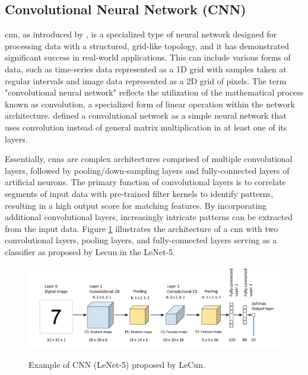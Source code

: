 \subsection{Convolutional Neural Network (CNN)}
\label{subsec:convolutional_neural_network_CNN}

\gls{cnn}, as introduced by \textcite{Lecun1998}, is a specialized type of neural network designed for processing data with a structured, grid-like topology, and it has demonstrated significant success in real-world applications. This can include various forms of data, such as time-series data represented as a 1D grid with samples taken at regular intervals and image data represented as a 2D grid of pixels. The term "convolutional neural network" reflects the utilization of the mathematical process known as convolution, a specialized form of linear operation within the network architecture. \textcite{Goodfellow2016} defined a convolutional network as a simple neural network that uses convolution instead of general matrix multiplication in at least one of its layers.

Essentially, \gls{cnn}s are complex architectures comprised of multiple convolutional layers, followed by pooling/down-sampling layers and fully-connected layers of artificial neurons. The primary function of convolutional layers is to correlate segments of input data with pre-trained filter kernels to identify patterns, resulting in a high output score for matching features. By incorporating additional convolutional layers, increasingly intricate patterns can be extracted from the input data. Figure \ref{fig:frmwk_cnn_LeNet-5} illustrates the architecture of a \gls{cnn} with two convolutional layers, pooling layers, and fully-connected layers serving as a classifier as proposed by Lecun in the LeNet-5.

\begin{figure}[htbp]
    \raggedright
        \caption{Example of CNN (LeNet-5) proposed by LeCun.}
        \includegraphics[width=1\textwidth]{resources/images/030-theoretical_framework/Framework_cnn_LeNet-5.png}
        \label{fig:frmwk_cnn_LeNet-5}
\end{figure}

